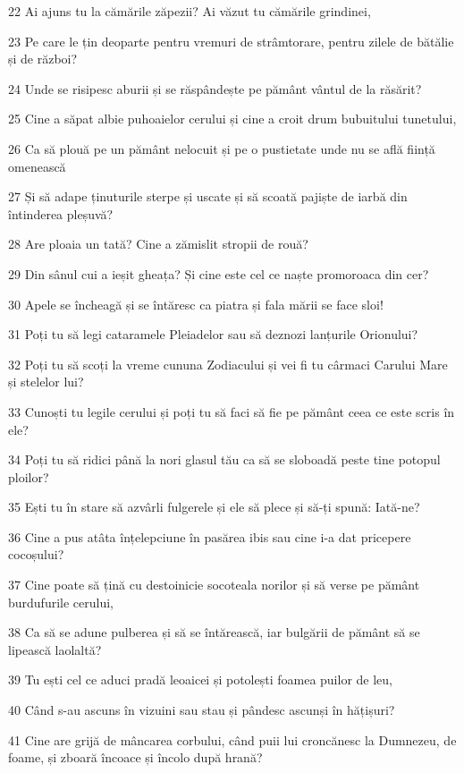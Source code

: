 \par 22 Ai ajuns tu la cămările zăpezii? Ai văzut tu cămările grindinei,
\par 23 Pe care le țin deoparte pentru vremuri de strâmtorare, pentru zilele de bătălie și de război?
\par 24 Unde se risipesc aburii și se răspândește pe pământ vântul de la răsărit?
\par 25 Cine a săpat albie puhoaielor cerului și cine a croit drum bubuitului tunetului,
\par 26 Ca să plouă pe un pământ nelocuit și pe o pustietate unde nu se află ființă omenească
\par 27 Și să adape ținuturile sterpe și uscate și să scoată pajiște de iarbă din întinderea pleșuvă?
\par 28 Are ploaia un tată? Cine a zămislit stropii de rouă?
\par 29 Din sânul cui a ieșit gheața? Și cine este cel ce naște promoroaca din cer?
\par 30 Apele se încheagă și se întăresc ca piatra și fala mării se face sloi!
\par 31 Poți tu să legi cataramele Pleiadelor sau să deznozi lanțurile Orionului?
\par 32 Poți tu să scoți la vreme cununa Zodiacului și vei fi tu cârmaci Carului Mare și stelelor lui?
\par 33 Cunoști tu legile cerului și poți tu să faci să fie pe pământ ceea ce este scris în ele?
\par 34 Poți tu să ridici până la nori glasul tău ca să se sloboadă peste tine potopul ploilor?
\par 35 Ești tu în stare să azvârli fulgerele și ele să plece și să-ți spună: Iată-ne?
\par 36 Cine a pus atâta înțelepciune în pasărea ibis sau cine i-a dat pricepere cocoșului?
\par 37 Cine poate să țină cu destoinicie socoteala norilor și să verse pe pământ burdufurile cerului,
\par 38 Ca să se adune pulberea și să se întărească, iar bulgării de pământ să se lipească laolaltă?
\par 39 Tu ești cel ce aduci pradă leoaicei și potolești foamea puilor de leu,
\par 40 Când s-au ascuns în vizuini sau stau și pândesc ascunși în hățișuri?
\par 41 Cine are grijă de mâncarea corbului, când puii lui croncănesc la Dumnezeu, de foame, și zboară încoace și încolo după hrană?

